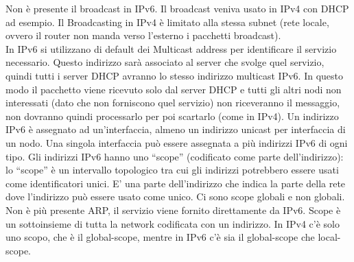 \documentclass{article}
\begin{document}
Non è presente il broadcast in IPv6. Il broadcast veniva usato in IPv4 con DHCP ad esempio. Il Broadcasting in IPv4 è limitato alla stessa subnet (rete locale, ovvero il router non manda verso l’esterno i pacchetti broadcast). \\
In IPv6 si utilizzano di default dei Multicast address per identificare il servizio necessario. Questo indirizzo sarà associato al server che svolge quel servizio, quindi tutti i server DHCP avranno lo stesso indirizzo multicast IPv6. In questo modo il pacchetto viene ricevuto solo dal server DHCP e tutti gli altri nodi non interessati (dato che non forniscono quel servizio) non riceveranno il messaggio, non dovranno quindi processarlo per poi scartarlo (come in IPv4).
Un indirizzo IPv6 è assegnato ad un’interfaccia, almeno un indirizzo unicast per interfaccia di un nodo. Una singola interfaccia può essere assegnata a più indirizzi IPv6 di ogni tipo. 
Gli indirizzi IPv6 hanno uno “scope” (codificato come parte dell’indirizzo): lo “scope” è un intervallo topologico tra cui gli indirizzi potrebbero essere usati come identificatori unici. E’ una parte dell’indirizzo che indica la parte della rete dove l’indirizzo può essere usato come unico.
Ci sono scope globali e non globali.
Non è più presente ARP, il servizio viene fornito direttamente da IPv6. Scope è un sottoinsieme di tutta la network codificata con un indirizzo.
In IPv4 c’è solo uno scopo, che è il global-scope, mentre in IPv6 c’è sia il global-scope che local-scope.
\end{document}
